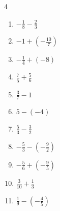 \begin{multicols}{4}
\begin{enumerate}

  \item $\displaystyle -\frac{1}{8} - \frac{2}{3}$


  \item $\displaystyle -1 + \left(-\frac{10}{7}\right)$


  \item $\displaystyle -\frac{1}{4} + \left(-8\right)$


  \item $\displaystyle \frac{7}{5} + \frac{5}{6}$


\columnbreak %

\resetques

  \item $\displaystyle \frac{3}{7} - 1$


  \item $\displaystyle 5 - \left(-4\right)$

        \phantom{$\displaystyle =9$}

  \item $\displaystyle \frac{5}{3} - \frac{3}{2}$


  \item $\displaystyle -\frac{5}{3} - \left(-\frac{9}{2}\right)$


  \item $\displaystyle -\frac{5}{6} + \left(-\frac{9}{5}\right)$


  \item $\displaystyle \frac{3}{10} + \frac{1}{3}$


  \item $\displaystyle \frac{1}{9} - \left(-\frac{4}{5}\right)$



\end{enumerate}
\end{multicols}
